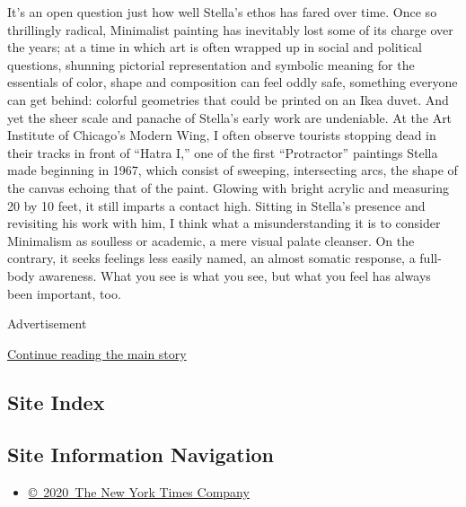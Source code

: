 It's an open question just how well Stella's ethos has fared over time.
Once so thrillingly radical, Minimalist painting has inevitably lost
some of its charge over the years; at a time in which art is often
wrapped up in social and political questions, shunning pictorial
representation and symbolic meaning for the essentials of color, shape
and composition can feel oddly safe, something everyone can get behind:
colorful geometries that could be printed on an Ikea duvet. And yet the
sheer scale and panache of Stella's early work are undeniable. At the
Art Institute of Chicago's Modern Wing, I often observe tourists
stopping dead in their tracks in front of ``Hatra I,'' one of the first
``Protractor'' paintings Stella made beginning in 1967, which consist of
sweeping, intersecting arcs, the shape of the canvas echoing that of the
paint. Glowing with bright acrylic and measuring 20 by 10 feet, it still
imparts a contact high. Sitting in Stella's presence and revisiting his
work with him, I think what a misunderstanding it is to consider
Minimalism as soulless or academic, a mere visual palate cleanser. On
the contrary, it seeks feelings less easily named, an almost somatic
response, a full-body awareness. What you see is what you see, but what
you feel has always been important, too.

Advertisement

\protect\hyperlink{after-bottom}{Continue reading the main story}

\hypertarget{site-index}{%
\subsection{Site Index}\label{site-index}}

\hypertarget{site-information-navigation}{%
\subsection{Site Information
Navigation}\label{site-information-navigation}}

\begin{itemize}
\tightlist
\item
  \href{https://help.nytimes3xbfgragh.onion/hc/en-us/articles/115014792127-Copyright-notice}{©~2020~The
  New York Times Company}
\end{itemize}

